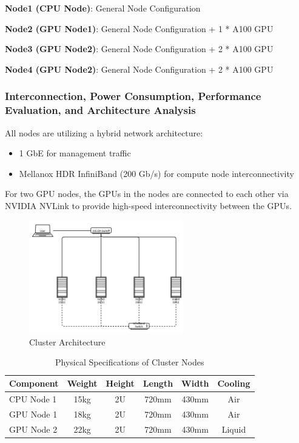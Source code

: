 \documentclass[a4paper,12pt]{article}
\begin{document}
\textbf{Node1 (CPU Node)}: General Node Configuration

\textbf{Node2 (GPU Node1)}: General Node Configuration + 1 * A100 GPU

\textbf{Node3 (GPU Node2)}: General Node Configuration + 2 * A100 GPU

\textbf{Node4 (GPU Node2)}: General Node Configuration + 2 * A100 GPU 

\subsubsection{Interconnection, Power Consumption, Performance Evaluation, and Architecture Analysis}

All nodes are utilizing a hybrid network architecture:
\begin{itemize}
    \item 1 GbE for management traffic
    \item Mellanox HDR InfiniBand (200 Gb/s) for compute node interconnectivity
\end{itemize}

For two GPU nodes, the GPUs in the nodes are connected to each other via NVIDIA NVLink to provide high-speed interconnectivity between the GPUs.

\begin{figure}[H]
    \centering
    \includegraphics[width=0.6\textwidth]{images/cluster/Cluster_Architecture.png}
    \caption{Cluster Architecture}
    \label{fig:cluster_arch}
\end{figure}

\begin{table}[H]
\centering
\vspace{0.5cm}
\begin{tabular}{lccccc}  
\toprule
Component & Weight & Height & Length & Width & Cooling \\
\midrule 
CPU Node 1 & 15kg & 2U & 720mm & 430mm & Air \\
GPU Node 1 & 18kg & 2U & 720mm & 430mm & Air \\
GPU Node 2 & 22kg & 2U & 720mm & 430mm & Liquid \\
\bottomrule
\end{tabular}
\caption{Physical Specifications of Cluster Nodes}
\end{table}
\end{document}
